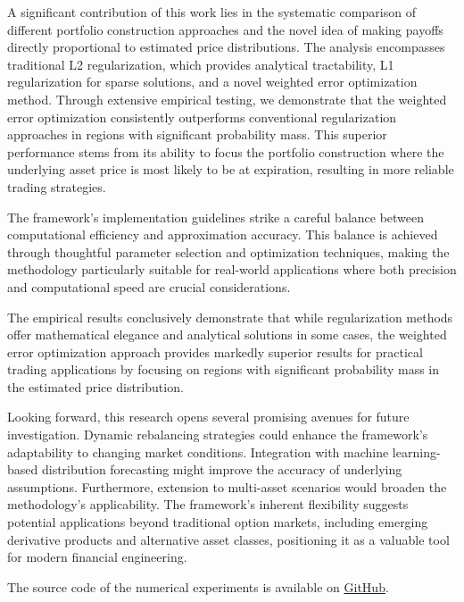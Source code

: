 \documentclass[12pt]{article}
\begin{document}
A significant contribution of this work lies in the systematic comparison of different portfolio 
construction approaches and the novel idea of making payoffs directly proportional to estimated 
price distributions. The analysis encompasses traditional L2 regularization, which provides 
analytical tractability, L1 regularization for sparse solutions, and a novel weighted error 
optimization method. Through extensive empirical testing, we demonstrate that the weighted error 
optimization consistently outperforms conventional regularization approaches in regions with 
significant probability mass. This superior performance stems from its ability to focus the 
portfolio construction where the underlying asset price is most likely to be at expiration, 
resulting in more reliable trading strategies.

The framework's implementation guidelines strike a careful balance between computational efficiency 
and approximation accuracy. This balance is achieved through thoughtful parameter selection and 
optimization techniques, making the methodology particularly suitable for real-world applications 
where both precision and computational speed are crucial considerations.

The empirical results conclusively demonstrate that while regularization methods offer mathematical 
elegance and analytical solutions in some cases, the weighted error optimization approach provides 
markedly superior results for practical trading applications by focusing on regions with significant 
probability mass in the estimated price distribution.

Looking forward, this research opens several promising avenues for future investigation. Dynamic 
rebalancing strategies could enhance the framework's adaptability to changing market conditions. 
Integration with machine learning-based distribution forecasting might improve the accuracy of 
underlying assumptions. Furthermore, extension to multi-asset scenarios would broaden the 
methodology's applicability. The framework's inherent flexibility suggests potential applications 
beyond traditional option markets, including emerging derivative products and alternative asset 
classes, positioning it as a valuable tool for modern financial engineering.

The source code of the numerical experiments is available on 
\href{https://github.com/VladKochetov007/payoff_approximation}{GitHub}.



\end{document}
